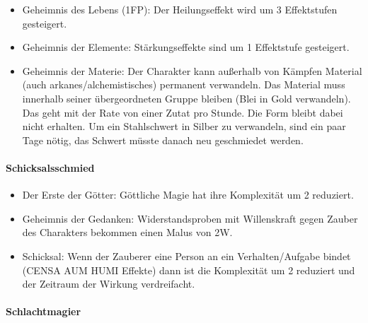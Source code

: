 \documentclass{article}
\begin{document}
\begin{itemize}
\item Geheimnis des Lebens (1FP): Der Heilungseffekt wird um 3 Effektstufen gesteigert.
\item Geheimnis der Elemente: Stärkungseffekte sind um 1 Effektstufe gesteigert.
\item Geheimnis der Materie: Der Charakter kann außerhalb von Kämpfen Material (auch arkanes/alchemistisches) permanent verwandeln. Das Material muss innerhalb seiner übergeordneten Gruppe bleiben (Blei in Gold verwandeln). Das geht mit der Rate von einer Zutat pro Stunde. Die Form bleibt dabei nicht erhalten. Um ein Stahlschwert in Silber zu verwandeln, sind ein paar Tage nötig, das Schwert müsste danach neu geschmiedet werden.
\end{itemize}

\paragraph{Schicksalsschmied}

\begin{itemize}
\item Der Erste der Götter: Göttliche Magie hat ihre Komplexität um 2 reduziert.
\item Geheimnis der Gedanken: Widerstandsproben mit Willenskraft gegen Zauber des Charakters bekommen einen Malus von 2W.
\item Schicksal: Wenn der Zauberer eine Person an ein Verhalten/Aufgabe bindet (CENSA AUM HUMI Effekte) dann ist die Komplexität um 2 reduziert und der Zeitraum der Wirkung verdreifacht.
\end{itemize}

\paragraph{Schlachtmagier}
\end{document}
